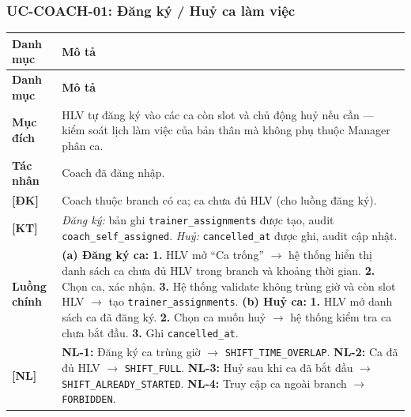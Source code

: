 \subsubsection{UC-COACH-01: Đăng ký / Huỷ ca làm việc}
\begingroup
\renewcommand{\arraystretch}{1.3}
\begin{longtable}{|>{\centering\arraybackslash}m{3cm}|>{\raggedright\arraybackslash}m{12cm}|}
\hline
\textbf{Danh mục} & \textbf{Mô tả} \\ \hline
\endfirsthead
\hline
\textbf{Danh mục} & \textbf{Mô tả} \\ \hline
\endhead
\hline
\endfoot
\textbf{Mục đích} & HLV tự đăng ký vào các ca còn slot và chủ động huỷ nếu cần — kiểm soát lịch làm việc của bản thân mà không phụ thuộc Manager phân ca. \\
\hline
\textbf{Tác nhân} & Coach đã đăng nhập. \\
\hline
\textbf{[ĐK]} & Coach thuộc branch có ca; ca chưa đủ HLV (cho luồng đăng ký). \\
\hline
\textbf{[KT]} & \emph{Đăng ký:} bản ghi \texttt{trainer\_assignments} được tạo, audit \texttt{coach\_self\_assigned}. \emph{Huỷ:} \texttt{cancelled\_at} được ghi, audit cập nhật. \\
\hline
\textbf{Luồng chính} & \textbf{(a) Đăng ký ca:} \textbf{1.} HLV mở ``Ca trống'' $\rightarrow$ hệ thống hiển thị danh sách ca chưa đủ HLV trong branch và khoảng thời gian. \textbf{2.} Chọn ca, xác nhận. \textbf{3.} Hệ thống validate không trùng giờ và còn slot HLV $\rightarrow$ tạo \texttt{trainer\_assignments}. \textbf{(b) Huỷ ca:} \textbf{1.} HLV mở danh sách ca đã đăng ký. \textbf{2.} Chọn ca muốn huỷ $\rightarrow$ hệ thống kiểm tra ca chưa bắt đầu. \textbf{3.} Ghi \texttt{cancelled\_at}. \\
\hline
\textbf{[NL]} & \textbf{NL-1:} Đăng ký ca trùng giờ $\rightarrow$ \texttt{SHIFT\_TIME\_OVERLAP}. \textbf{NL-2:} Ca đã đủ HLV $\rightarrow$ \texttt{SHIFT\_FULL}. \textbf{NL-3:} Huỷ sau khi ca đã bắt đầu $\rightarrow$ \texttt{SHIFT\_ALREADY\_STARTED}. \textbf{NL-4:} Truy cập ca ngoài branch $\rightarrow$ \texttt{FORBIDDEN}. \\
\hline
\end{longtable}
\endgroup

